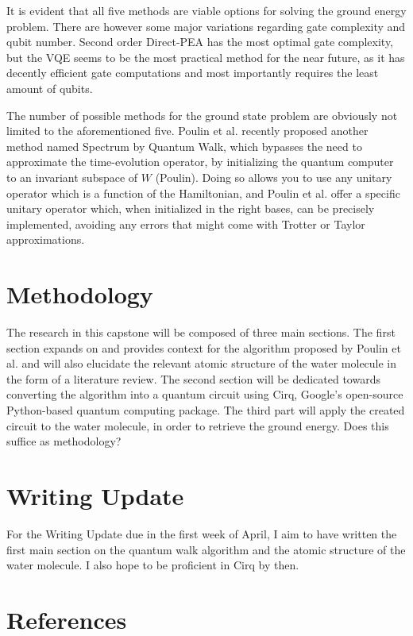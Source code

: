 \documentclass{article}
\begin{document}
It is evident that all five methods are viable options for solving the ground energy problem. There are however some major variations regarding gate complexity and qubit number. Second order Direct-PEA has the most optimal gate complexity, but the VQE seems to be the most practical method for the near future, as it has decently efficient gate computations and most importantly requires the least amount of qubits.


The number of possible methods for the ground state problem are obviously not limited to the aforementioned five. Poulin et al. recently proposed another method named Spectrum by Quantum Walk, which bypasses the need to approximate the time-evolution operator, by initializing the quantum computer to an invariant subspace of $W$ (Poulin). Doing so allows you to use any unitary operator which is a function of the Hamiltonian, and Poulin et al. offer a specific unitary operator which, when initialized in the right bases, can be precisely implemented, avoiding any errors that might come with Trotter or Taylor approximations.


\section{Methodology}


The research in this capstone will be composed of three main sections. The first section expands on and provides context for the algorithm proposed by Poulin et al. and will also elucidate the relevant atomic structure of the water molecule in the form of a literature review. The second section will be dedicated towards converting the algorithm into a quantum circuit using Cirq, Google's open-source Python-based quantum computing package. The third part will apply the created circuit to the water molecule, in order to retrieve the ground energy. Does this suffice as methodology?


\section{Writing Update}

For the Writing Update due in the first week of April, I aim to have written the first main section on the quantum walk algorithm and the atomic structure of the water molecule. I also hope to be proficient in Cirq by then.



\section{References}
\end{document}
